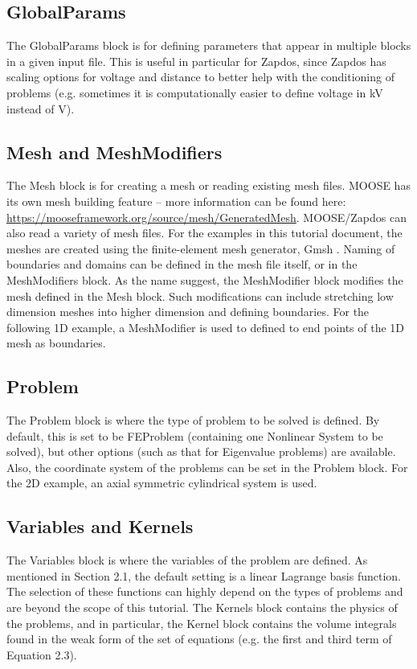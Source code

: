 \documentclass[final]{report}
\begin{document}
  \subsection{GlobalParams}
  The GlobalParams block is for defining parameters that appear in multiple blocks in a given input file. This is useful in particular for Zapdos, since Zapdos has scaling options for voltage and distance to better help with the conditioning of problems (e.g. sometimes it is computationally easier to define voltage in kV instead of V).
  \subsection{Mesh and MeshModifiers}
  The Mesh block is for creating a mesh or reading existing mesh files. MOOSE has its own mesh building feature -- more information can be found here: \url{https://mooseframework.org/source/mesh/GeneratedMesh}. MOOSE/Zapdos can also read a variety of mesh files. For the examples in this tutorial document, the meshes are created using the finite-element mesh generator, Gmsh \cite{Gmsh}. Naming of boundaries and domains can be defined in the mesh file itself, or in the MeshModifiers block. As the name suggest, the MeshModifier block modifies the mesh defined in the Mesh block. Such modifications can include stretching low dimension meshes into higher dimension and defining boundaries. For the following 1D example, a MeshModifier is used to defined to end points of the 1D mesh as boundaries.
  \subsection{Problem}
  The Problem block is where the type of problem to be solved is defined. By default, this is set to be FEProblem (containing one Nonlinear System to be solved), but other options (such as that for Eigenvalue problems) are available. Also, the coordinate system of the problems can be set in the Problem block. For the 2D example, an axial symmetric cylindrical system is used.
  \subsection{Variables and Kernels}
  The Variables block is where the variables of the problem are defined. As mentioned in Section 2.1, the default setting is a linear Lagrange basis function. The selection of these functions can highly depend on the types of problems and are beyond the scope of this tutorial. The Kernels block contains the physics of the problems, and in particular, the Kernel block contains the volume integrals found in the weak form of the set of equations (e.g. the first and third term of Equation 2.3).
\end{document}
